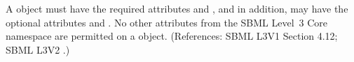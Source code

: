 A \Trigger object must have the required attributes
 and , and in addition, may have the
optional attributes  and .  No other
attributes from the SBML Level~3 Core namespace are permitted on a \Trigger
object.  (References: SBML L3V1 Section 4.12; SBML L3V2 .)
